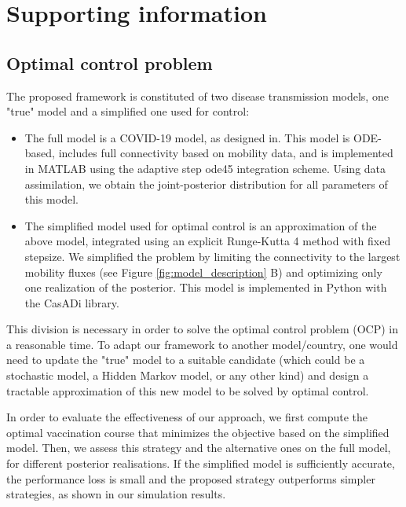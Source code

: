 \section{Supporting information}
\renewcommand{\thefigure}{S\arabic{figure}}
\renewcommand{\theequation}{S\arabic{equation}}
\setcounter{figure}{0}
\setcounter{equation}{0}
\subsection*{Optimal control problem}
The proposed framework is constituted of two disease transmission models, one "true" model and a simplified one used for control:
\begin{itemize}
    \item The full model is a COVID-19 model, as designed in\cite{Gatto:SpreadDynamicsCOVID19:2020, Bertuzzo:GeographyCOVID19Spread:2020}. This model is ODE-based, includes full connectivity based on mobility data, and is implemented in MATLAB using the adaptive step ode45 integration scheme. Using data assimilation, we obtain the joint-posterior distribution for all parameters of this model. 
    \item The simplified model used for optimal control is an approximation of the above model, integrated using an explicit Runge-Kutta 4 method with fixed stepsize. We simplified the problem by limiting the connectivity to the largest mobility fluxes (see Figure \ref{fig:model_description} B) and optimizing only one realization of the posterior. This model is implemented in Python with the CasADi library.
\end{itemize}
This division is necessary in order to solve the optimal control problem (OCP) in a reasonable time. To adapt our framework to another model/country, one would need to update the "true" model to a suitable candidate (which could be a stochastic model, a Hidden Markov model, or any other kind) and design a tractable approximation of this new model to be solved by optimal control.

In order to evaluate the effectiveness of our approach, we first compute the optimal vaccination course that minimizes the objective based on the simplified model. Then, we assess this strategy and the alternative ones on the full model, for different posterior realisations. If the simplified model is sufficiently accurate, the performance loss is small and the proposed strategy outperforms simpler strategies, as shown in our simulation results.


